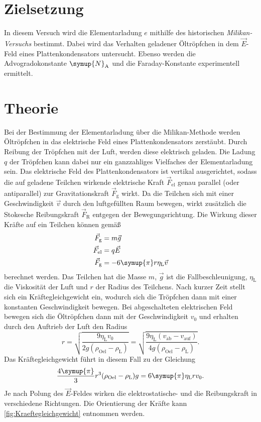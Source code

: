 \section{Zielsetzung}
\label{sec:Ziel}
In diesem Versuch wird die Elementarladung $e$ mithilfe des historischen \textit{Milikan-Versuchs} bestimmt. Dabei wird das Verhalten geladener
Öltröpfchen in dem $\vec{E}$-Feld eines Plattenkondensators untersucht. Ebenso werden die Advogradokonstante $\symup{N}_{\text{A}}$ und die Faraday-Konstante
experimentell ermittelt.

\section{Theorie}
\label{sec:Theorie}
Bei der Bestimmung der Elementarladung über die Milikan-Methode werden Öltröpfchen in das elektrische Feld eines Plattenkondensators zerstäubt.
Durch Reibung der Tröpfchen mit der Luft, werden diese elektrisch geladen. Die Ladung $q$ der Tröpfchen kann dabei nur ein ganzzahliges
Vielfaches der Elementarladung sein.
Das elektrische Feld des Plattenkondensators ist vertikal ausgerichtet, sodass die auf geladene Teilchen wirkende elektrische Kraft 
$\vec{F}_\text{el}$ genau parallel (oder antiparallel) zur Gravitationskraft $\vec{F}_\text{g}$ wirkt. Da die Teilchen sich mit einer 
Geschwindigkeit $\vec{v}$ durch den luftgefüllten Raum bewegen, wirkt zusätzlich die Stokesche Reibungskraft $\vec{F}_\text{R}$ entgegen der Bewegungsrichtung.
Die Wirkung dieser Kräfte auf ein Teilchen können gemäß
\begin{align}
    \label{eqn:Kraefte}
    \vec{F}_\text{g} &= m \vec{g} \\
    \vec{F}_\text{el} &= q \vec{E} \\
    \vec{F}_\text{g} &= -6\symup{\pi}r\eta_\text{L} \vec{v}
\end{align}
berechnet werden. Das Teilchen hat die Masse $m$, $\vec{g}$ ist die Fallbeschleunigung, $\eta_\text{L}$ die
Viskosität der Luft und $r$ der Radius des Teilchens.
Nach kurzer Zeit stellt sich ein Kräftegleichgewicht ein, wodurch sich die Tröpfchen dann mit einer konstanten Geschwindigkeit bewegen.
Bei abgeschalteten elektrischen Feld bewegen sich die Öltröpfchen dann mit der Geschwindigkeit $v_0$ und erhalten durch den Auftrieb der Luft den Radius
\begin{equation}
    \label{eqn:Radius}
    r = \sqrt{\frac{9 \eta_\text{L}v_0}{2g(\rho_\text{Oel}- \rho_\text{L})}} = \sqrt{\frac{9 \eta_\text{L}(v_\text{ab} - v_\text{auf})}{4g(\rho_\text{Oel}- \rho_\text{L})}}.
\end{equation}
Das Kräftegleichgewicht führt in diesem Fall zu der Gleichung
\begin{equation*}
    \frac{4\symup{\pi}}{3}r^3(\rho_\text{Oel}- \rho_\text{L})g = 6 \symup{\pi} \eta_\text{L}r v_0.
\end{equation*}
Je nach Polung des $\vec{E}$-Feldes wirken die elektrostatische- und die Reibungskraft in verschiedene Richtungen. 
Die Orientierung der Kräfte kann \autoref{fig:Kraeftegleichgewicht} entnommen werden.

